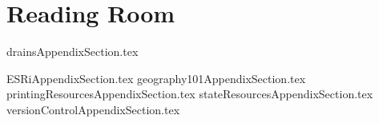 
\chapter{Reading Room}
{drainsAppendixSection.tex}  
\clearpage 
  
{ESRiAppendixSection.tex}
\clearpage
{geography101AppendixSection.tex}
\clearpage
{printingResourcesAppendixSection.tex}
\clearpage
{stateResourcesAppendixSection.tex}
\clearpage
{versionControlAppendixSection.tex}

